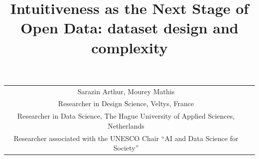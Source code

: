 \documentclass[]{hdsr}
\theoremstyle{plain}      %
\theoremstyle{definition} %
\theoremstyle{remark}     %
\begin{document}


\begin{center}
  \title{Intuitiveness as the Next Stage of Open Data: dataset design and complexity}
  \maketitle

  \thispagestyle{empty}
  \vspace*{.2in}

  \begin{tabular}{cc}
    Sarazin Arthur\upstairs{\affilone,*}, Mourey Mathis\upstairs{\affiltwo}
   \\[0.25ex]
   {\small \upstairs{\affilone} Researcher in Design Science, Veltys, France} \\
   {\small \upstairs{\affiltwo} Researcher in Data Science, The Hague University of Applied Sciences, Netherlands} \\
   {\small \upstairs{*} Researcher associated with the UNESCO Chair ``AI and Data Science for Society''} \\
  \end{tabular}

  \vspace*{0.4in}


\end{center}
\end{document}
